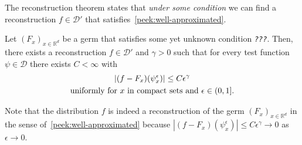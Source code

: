 The reconstruction theorem states that \emph{under some condition} we can find a reconstruction \(f \in \mathcal{D}'\) that satisfies~\eqref{peek:well-approximated}.

\begin{conjecture}\label{peek:conjecture}
    Let \({(F_x)}_{x \in \mathbb{R}^d}\) be a germ that satisfies some yet unknown condition \emph{\texttt{???}}. Then, there exists a reconstruction \(f \in \mathcal{D}'\) and \(\gamma > 0\) such that for every test function \(\psi \in \mathcal{D}\) there exists \(C < {\infty}\) with
    \begin{gather}\label{peek:eq:conjecture}
        |(f-F_x)(\psi^\epsilon_x)| \leq C \epsilon^{\gamma} \\
        \text{uniformly for \(x\) in compact sets and \( \epsilon \in (0,1] \)} \nonumber. %
    \end{gather}
    
\end{conjecture}

Note that the distribution \(f\) is indeed a reconstruction of the germ \({(F_x)}_{x \in \mathbb{R}^d}\) in the sense of~\eqref{peek:well-approximated} because \(|(f-F_x)(\psi^\epsilon_x)| \leq C  \epsilon^{\gamma} \to 0\) as \(\epsilon \to 0\).

\vspace{0.4cm} 

